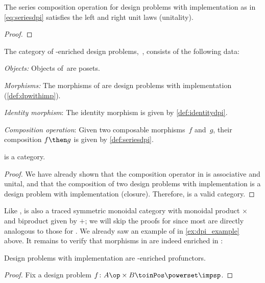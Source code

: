 {\begin{lemma}
  The series composition operation for design problems with implementation as in \cref{eq:seriesdpi} satisfies the left and right unit laws (unitality).
\end{lemma}

\begin{proof}
\end{proof}


\begin{definition}
  The category of \Set-enriched design problems,~\DPI, consists of the following data:
  \begin{compactenum}
    \item \emph{Objects:}  Objects of~\DPI are posets.
    \item \emph{Morphisms:} The morphisms of \DPI are design problems with implementation (\cref{def:dpwithimp}).
    \item \emph{Identity morphism}: The identity morphism is given by \cref{def:identitydpi}.
    \item \emph{Composition operation}: Given two composable morphisms~$f$ and~$g$, their composition $f\then g$ is given by \cref{def:seriesdpi}.
  \end{compactenum}
\end{definition}

\begin{lemma}
  \DPI is a category.
\end{lemma}

\begin{proof}
  We have already shown that the composition operator in \DPI is associative and unital, and that the composition of two design problems with implementation is a design problem with implementation (closure). Therefore, \DPI is a valid category.
\end{proof}

Like \DP, \DPI is also a traced symmetric monoidal category with monoidal product $\times$ and biproduct given by $+$; we will skip the proofs for \DPI since most are directly analogous to those for \DP. We already saw an example of \DPI in \cref{ex:dpi_example} above. It remains to verify that morphisms in \DPI are indeed enriched in \Set:

\begin{proposition}
  Design problems with implementation are \Set-enriched profunctors.
\end{proposition}
\begin{proof}
  Fix a design problem $f \colon A\op \times B \toinPos \powerset \impsp$.
\end{proof}

}
